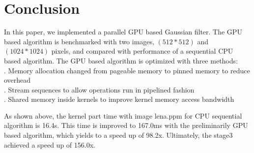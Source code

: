 \documentclass[journal,11pt,onecolumn,draftclsnofoot]{ieeeconf}  %
\begin{document}
\section{Conclusion} 
In this paper, we implemented a parallel GPU based Gaussian filter. The GPU based algorithm is benchmarked with two images, $(512*512)$ and $(1024*1024)$ pixels, and compared with performance of a sequential CPU based algorithm. The GPU based algorithm is optimized with three methods: \\
. Memory allocation changed from pageable memory to pinned memory to reduce overhead\\
. Stream sequences to allow operations run in pipelined fashion \\
. Shared memory inside kernels to improve kernel memory access bandwidth\par


As shown above, the kernel part time with image lena.ppm for CPU sequential algorithm is 16.4s. This time is improved to 167.0ms with the preliminarily GPU based algorithm, which yields to a speed up of 98.2x. Ultimately, the stage3 achieved a speed up of 156.0x.

\clearpage
\appendix
\end{document}
